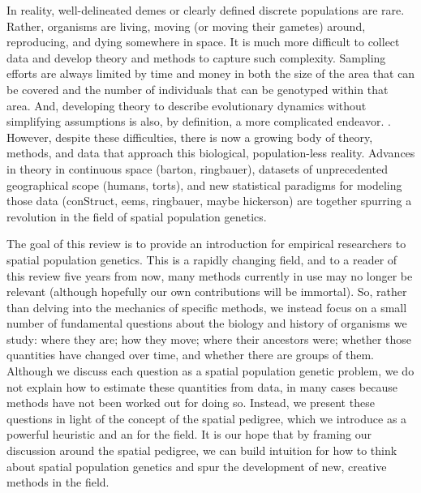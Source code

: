 \documentclass{ar-1col}
\newcommand{\g}[1]{{\color{blue}{#1}}}
\begin{document}
In reality, well-delineated demes or clearly defined discrete populations are rare.
Rather, organisms are living,
moving (or moving their gametes) around,
reproducing, and dying somewhere in space.
It is much more difficult to collect data and develop theory and methods
to capture such complexity.
Sampling efforts are always limited by time and money
in both the size of the area that can be covered
and the number of individuals that can be genotyped within that area.
And, developing theory to describe evolutionary dynamics
without simplifying assumptions is also,
by definition,
a more complicated endeavor.
\g{go into details of lineages in 2D space and pain in the torus and diffusion approximations?
pretty nicely laid out by BartonDepaulisEtheridge, but maybe not the place?}.
However, despite these difficulties,
there is now a growing body of theory, methods, and data
that approach this biological, population-less reality.
Advances in theory in continuous space (barton, ringbauer),
datasets of unprecedented geographical scope (humans, torts),
and new statistical paradigms for modeling those data (conStruct, eems, ringbauer, maybe hickerson)
are together spurring a revolution in the field of spatial population genetics.

\g{The field of spatial population genetics is the study of population genetics, in space.
That is, the principal goals of population genetics --
to study patterns of genetic variation within and between populations and
learn about the processes generating those patterns --
are the same as those of spatial population genetics.
However, spatial population genetics as a field is particularly concerned
with the spatial context of these patterns,
leveraging information in the position of samples
to learn about processes governing the distribution of genetic diversity across landscapes.
Spatial population genetics allows researchers
to unite the quantitative descriptions of population genetics
with fundamental questions about the ecology and evolution of organisms.}

The goal of this review
is to provide an introduction for empirical researchers
to spatial population genetics.
This is a rapidly changing field,
and to a reader of this review five years from now,
many methods currently in use may no longer be relevant
(although hopefully our own contributions will be immortal).
So, rather than delving into the mechanics of specific methods,
we instead focus on a small number of fundamental questions 
about the biology and history of organisms we study:
where they are; how they move; where their ancestors were;
whether those quantities have changed over time, 
and whether there are groups of them.
Although we discuss each question
as a spatial population genetic problem,
we do not explain how to estimate these quantities from data, 
in many cases because methods have not been worked out for doing so.
Instead, we present these questions 
in light of the concept of the spatial pedigree,
which we introduce as a powerful heuristic
and an \g{organizing principle} for the field.
It is our hope that by framing our discussion around the spatial pedigree, 
we can build intuition for how to think about spatial population genetics 
and spur the development of new, creative methods in the field.
\end{document}
